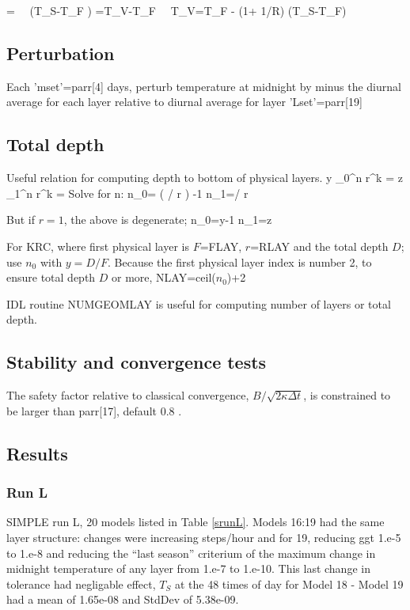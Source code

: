 \documentclass{article}
\begin{document}
\qb {} =   
\ \mapsto \  \left(T_S-T_F \right)   =T_V-T_F
\ \mapsto \ T_V=T_F - (1+ 1/R) (T_S-T_F)\qe

\subsection{Perturbation} 

Each 'mset'=parr[4] days, perturb temperature at midnight by minus the diurnal average for each layer relative to diurnal average for layer 'Lset'=parr[19]

\subsection{Total depth}
Useful relation for computing depth to bottom of physical layers.
\qb y \equiv \sum_0^n r^k =     
  z \equiv \sum_1^n r^k =   \qe
Solve for n:
\qb n_0= \left( \ln \left[ 1+y(r-1) \right]  / \ln r \right) -1  
n_1=\ln  {} / \ln r \qe

But if $r=1$, the above is degenerate;  \qb n_0=y-1  n_1=z \qe 

For KRC, where first physical layer is $F$=FLAY, $r$=RLAY and the total depth $D$; use $n_0$ with $y=D/F$. Because the first physical layer index is number 2, to ensure total depth $D$ or more, NLAY=ceil($n_0$)+2

IDL routine NUMGEOMLAY is useful for computing number of layers or total depth.

\subsection{Stability and convergence tests}
The safety factor relative to classical convergence, $ B/\sqrt{2 \kappa \Delta t }$,  is constrained to be larger than parr[17], default 0.8 .
 
 
\subsection{Results} 
\subsubsection{Run L} %

SIMPLE run L, 20 models listed in Table \ref{srunL}.  Models 16:19 had the same
layer structure: changes were increasing steps/hour and for 19, reducing ggt
1.e-5 to 1.e-8 and reducing the ``last season'' criterium of the maximum change
in midnight temperature of any layer from 1.e-7 to 1.e-10. This last change in
tolerance had negligable effect, $T_S$ at the 48 times of day for Model 18 -
Model 19 had a mean of 1.65e-08 and StdDev of 5.38e-09.
\end{document}
